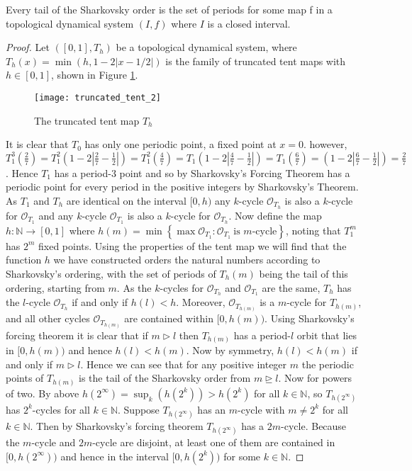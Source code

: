 \begin{thm} \label{thm:sharkovsky-realisation-theorem}
    Every tail of the Sharkovsky order is the set of periods for some map f in a topological dynamical system $(I, f)$ where $I$ is a closed interval.
    \begin{proof}
        Let $([0, 1], T_h)$ be a topological dynamical system, where $T_h(x) = \min(h, 1-2|x-1/2|)$ is the family of truncated tent maps with $h \in [0, 1]$, shown in Figure \ref{fig:truncated_tent}.
        \begin{figure}[h]
            \centering
            \texttt{[image: truncated\_tent\_2]}
            \label{fig:truncated_tent}
            \caption{The truncated tent map $T_h$}
        \end{figure}
        It is clear that $T_0$ has only one periodic point, a fixed point at $x = 0$. however, $T_1^3\left(\frac{2}{7}\right) = T_1^2\left(1-2\left\lvert\frac{2}{7} - \frac{1}{2}\right\rvert\right) = T_1^2\left(\frac{4}{7}\right) = T_1\left(1-2\left\lvert\frac{4}{7} - \frac{1}{2}\right\rvert\right) = T_1\left(\frac{6}{7}\right) = \left(1-2\left\lvert\frac{6}{7} - \frac{1}{2}\right\rvert\right) = \frac{2}{7}$. Hence $T_1$ has a period-$3$ point and so by Sharkovsky's Forcing Theorem has a periodic point for every period in the positive integers by Sharkovsky's Theorem. As $T_1$ and $T_h$ are identical on the interval $[0, h)$ any $k$-cycle $\mathcal{O}_{T_h}$ is also a $k$-cycle for $\mathcal{O}_{T_1}$ and any $k$-cycle $\mathcal{O}_{T_1}$ is also a $k$-cycle for $\mathcal{O}_{T_h}$. Now define the map $h: \mathbb{N} \to [0, 1]$ where $h(m) = \min \left\lbrace \max \mathcal{O}_{T_1} : \mathcal{O}_{T_1} \ \text{is $m$-cycle} \right\rbrace$, noting that $T_1^m$ has $2^m$ fixed points. Using the properties of the tent map we will find that the function $h$ we have constructed orders the natural numbers according to Sharkovsky's ordering, with the set of periods of $T_h(m)$ being the tail of this ordering, starting from $m$. As the $k$-cycles for $\mathcal{O}_{T_h}$ and $\mathcal{O}_{T_1}$ are the same, $T_h$ has the $l$-cycle $\mathcal{O}_{T_h}$ if and only if $h(l) < h$. Moreover, $\mathcal{O}_{T_{h(m)}}$ is a $m$-cycle for $T_{h(m)}$, and all other cycles $\mathcal{O}_{T_{h(m)}}$ are contained within $[0, h(m))$. Using Sharkovsky's forcing theorem it is clear that if $m \rhd l$ then $T_{h(m)}$ has a period-$l$ orbit that lies in $[0, h(m))$ and hence $h(l) < h(m)$. Now by symmetry, $h(l) < h(m)$ if and only if $m \rhd l$. Hence we can see that for any positive integer $m$ the periodic points of $T_{h(m)}$ is the tail of the Sharkovsky order from $m \unrhd l$. Now for powers of two. By above $h(2^\infty) = \sup_k(h(2^k)) > h(2^k)$ for all $k \in \mathbb{N}$, so $T_{h(2^\infty)}$ has $2^k$-cycles for all $k \in \mathbb{N}$. Suppose $T_{h(2^\infty)}$ has an $m$-cycle with $m \neq 2^k$ for all $k \in \mathbb{N}$. Then by Sharkovsky's forcing theorem $T_{h(2^\infty)}$ has a $2m$-cycle. Because the $m$-cycle and $2m$-cycle are disjoint, at least one of them are contained in $[0, h(2^\infty))$ and hence in the interval $[0, h(2^k))$ for some $k \in \mathbb{N}$.
    \end{proof}
\end{thm}

